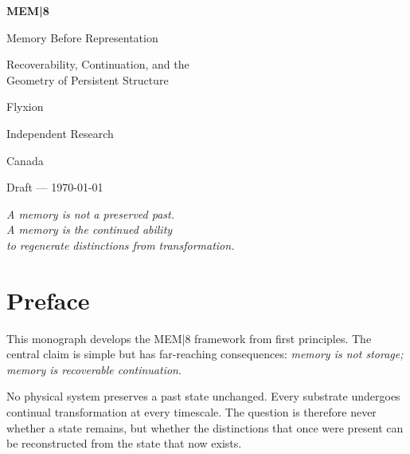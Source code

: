 \documentclass[12pt, oneside]{book}
\theoremstyle{plain}
\theoremstyle{definition}
\theoremstyle{remark}
\begin{document}
\begin{titlepage}
  \centering
  \vspace*{2cm}
  {\Huge\bfseries MEM|8\par}
  \vspace{0.8cm}
  {\LARGE Memory Before Representation\par}
  \vspace{0.5cm}
  {\large Recoverability, Continuation, and the\\
         Geometry of Persistent Structure\par}
  \vspace{2cm}
  \vspace{1cm}
  {\large Flyxion\par}
  \vspace{0.3cm}
  {\normalsize Independent Research\par}
  \vspace{0.3cm}
  {\normalsize Canada\par}
  \vspace{2cm}
  {\small Draft --- \today\par}
  \vfill
\end{titlepage}

\frontmatter

\clearpage
\vspace*{5cm}
\begin{center}
\itshape
A memory is not a preserved past.\\[4pt]
A memory is the continued ability\\
to regenerate distinctions from transformation.
\end{center}
\vfill
\clearpage

\tableofcontents

\chapter*{Preface}

This monograph develops the MEM|8 framework from first principles.
The central claim is simple but has far-reaching consequences:
\emph{memory is not storage; memory is recoverable continuation}.

No physical system preserves a past state unchanged.
Every substrate undergoes continual transformation at every timescale.
The question is therefore never whether a state remains, but
whether the distinctions that once were present can be reconstructed
from the state that now exists.
\end{document}

